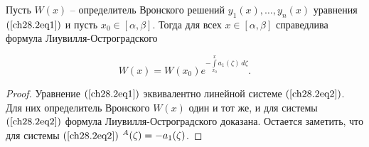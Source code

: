 \begin{thm}
Пусть $W(x)$ -- определитель Вронского решений $y_1(x), \ldots, y_n(x)$ уравнения $(\ref{ch28.2eq1})$ и пусть $x_0 \in [\alpha, \beta]$. Тогда для всех $x \in [\alpha, \beta]$ справедлива формула Лиувилля-Остроградского

$$
W(x) = W(x_0) e^{- \int\limits_{x_0}^{x} a_1(\zeta) \,d\zeta}.
$$
\end{thm}

\begin{proof}
Уравнение $(\ref{ch28.2eq1})$ эквивалентно линейной системе $(\ref{ch28.2eq2})$. Для них определитель Вронского $W(x)$ один и тот же, и для системы $(\ref{ch28.2eq2})$ формула Лиувилля-Остроградского доказана. Остается заметить, что для системы $(\ref{ch28.2eq2})$ $\sp A(\zeta) = - a_1(\zeta)$.
\end{proof}